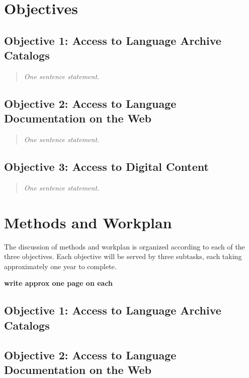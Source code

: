 \documentclass[11pt]{nsf}
\def\todo#1{\textbf{\large#1}}
\begin{document}
\vspace{1in}

\section{Objectives}

\subsection*{Objective 1: Access to Language Archive Catalogs}

\begin{quote}
{\it
  One sentence statement.
}
\end{quote}

\subsection*{Objective 2: Access to Language Documentation on the Web}

\begin{quote}
{\it
  One sentence statement.
}
\end{quote}

\subsection*{Objective 3: Access to Digital Content}

\begin{quote}
{\it
  One sentence statement.
}
\end{quote}

\section{Methods and Workplan}

The discussion of methods and workplan is organized according to
each of the three objectives.  Each objective will be served by
three subtasks, each taking approximately one year to complete.

\todo{write approx one page on each}

\subsection*{Objective 1: Access to Language Archive Catalogs}

\vspace{1in}

\subsection*{Objective 2: Access to Language Documentation on the Web}
\end{document}
